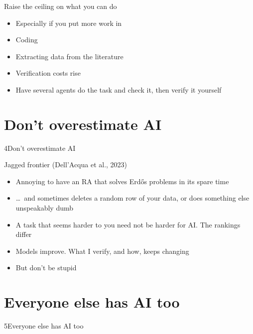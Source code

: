 \documentclass[11pt]{beamer}
\newcommand{\srccite}[1]{{\scriptsize\textcolor{citecol}{#1}}}
\begin{document}
\begin{frame}{Raise the ceiling on what you can do}
\pause
\begin{itemize}\setlength\itemsep{10pt}
\item Especially if you put more work in \pause
\item Coding \pause
\item Extracting data from the literature \pause
\item Verification costs rise \pause
\item Have several agents do the task and check it, then verify it yourself
\end{itemize}
\end{frame}


\section{Don't overestimate AI}

\begin{transition}{4}{Don't overestimate AI}
\end{transition}


\begin{frame}{Jagged frontier}
\srccite{(Dell'Acqua et al., 2023)}
\pause
\begin{itemize}\setlength\itemsep{10pt}
\item Annoying to have an RA that solves Erd\H{o}s problems in its spare time \pause
\item \ldots\ and sometimes deletes a random row of your data, or does something else unspeakably dumb \pause
\item A task that seems harder to you need not be harder for AI. The rankings differ \pause
\item Models improve. What I verify, and how, keeps changing \pause
\item But don't be stupid
\end{itemize}
\end{frame}


\section{Everyone else has AI too}

\begin{transition}{5}{Everyone else has AI too}
\end{transition}
\end{document}
